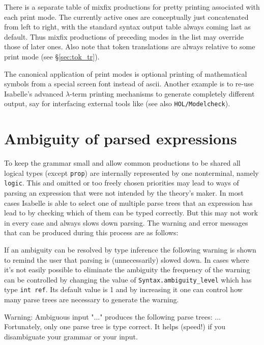 There is a separate table of mixfix productions for pretty printing
associated with each print mode. The currently active ones are
conceptually just concatenated from left to right, with the standard
syntax output table always coming last as default.  Thus mixfix
productions of preceding modes in the list may override those of later
ones.  Also note that token translations are always relative to some
print mode (see \S\ref{sec:tok_tr}).

\medskip The canonical application of print modes is optional printing
of mathematical symbols from a special screen font instead of {\sc
  ascii}. Another example is to re-use Isabelle's advanced
$\lambda$-term printing mechanisms to generate completely different
output, say for interfacing external tools like  (see also \texttt{HOL/Modelcheck}).



\section{Ambiguity of parsed expressions} \label{sec:ambiguity}

To keep the grammar small and allow common productions to be shared
all logical types (except {\tt prop}) are internally represented
by one nonterminal, namely {\tt logic}. This and omitted or too freely
chosen priorities may lead to ways of parsing an expression that were
not intended by the theory's maker. In most cases Isabelle is able to
select one of multiple parse trees that an expression has lead
to by checking which of them can be typed correctly. But this may not
work in every case and always slows down parsing.
The warning and error messages that can be produced during this process are
as follows:

If an ambiguity can be resolved by type inference the following
warning is shown to remind the user that parsing is (unnecessarily)
slowed down. In cases where it's not easily possible to eliminate the
ambiguity the frequency of the warning can be controlled by changing
the value of {\tt Syntax.ambiguity_level} which has type {\tt int
ref}. Its default value is 1 and by increasing it one can control how
many parse trees are necessary to generate the warning.

\begin{ttbox}
{\out Warning: Ambiguous input "..."}
{\out produces the following parse trees:}
{\out ...}
{\out Fortunately, only one parse tree is type correct.}
{\out It helps (speed!) if you disambiguate your grammar or your input.}
\end{ttbox}

